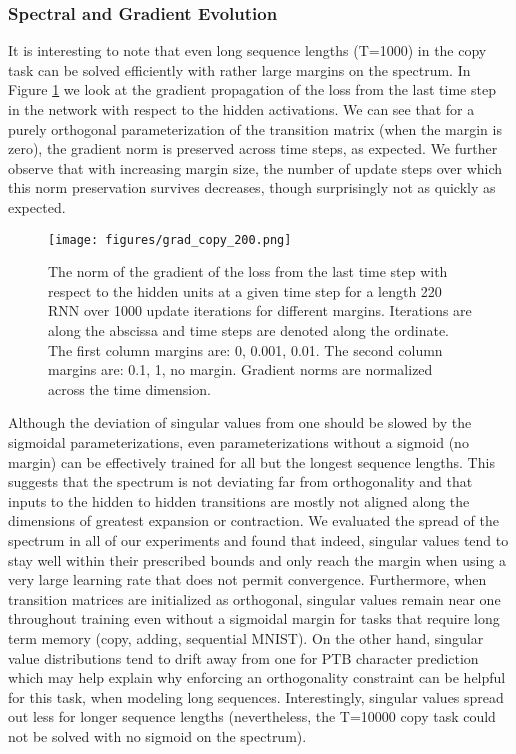 \documentclass{article} %
\begin{document}
\subsubsection{Spectral and Gradient Evolution}

It is interesting to note that even long sequence lengths (T=1000) in the copy task can be solved efficiently with rather large margins on the spectrum. In Figure \ref{fig:gradients} we look at the gradient propagation of the loss from the last time step in the network with respect to the hidden activations. We can see that for a purely orthogonal parameterization of the transition matrix (when the margin is zero), the gradient norm is preserved across time steps, as expected. We further observe that with increasing margin size, the number of update steps over which this norm preservation survives decreases, though surprisingly not as quickly as expected.

\begin{figure}[htb!]
\centering
\texttt{[image: figures/grad\_copy\_200.png]}
\caption{The norm of the gradient of the loss from the last time step with respect to the hidden units at a given time step for a length 220 RNN over 1000 update iterations for different margins. Iterations are along the abscissa and time steps are denoted along the ordinate. The first column margins are: 0, 0.001, 0.01. The second column margins are: 0.1, 1, no margin. Gradient norms are normalized across the time dimension.}
\label{fig:gradients}
\end{figure}

Although the deviation of singular values from one should be slowed by the sigmoidal parameterizations, even parameterizations without a sigmoid (no margin) can be effectively trained for all but the longest sequence lengths. This suggests that the spectrum is not deviating far from orthogonality and that inputs to the hidden to hidden transitions are mostly not aligned along the dimensions of greatest expansion or contraction. We evaluated the spread of the spectrum in all of our experiments and found that indeed, singular values tend to stay well within their prescribed bounds and only reach the margin when using a very large learning rate that does not permit convergence. Furthermore, when transition matrices are initialized as orthogonal, singular values remain near one throughout training even without a sigmoidal margin for tasks that require long term memory (copy, adding, sequential MNIST). On the other hand, singular value distributions tend to drift away from one for PTB character prediction which may help explain why enforcing an orthogonality constraint can be helpful for this task, when modeling long sequences. Interestingly, singular values spread out less for longer sequence lengths (nevertheless, the T=10000 copy task could not be solved with no sigmoid on the spectrum).
\end{document}
